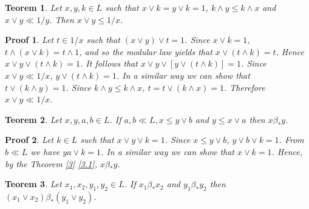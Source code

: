 \documentclass[a4paper,12pt]{article}
\numberwithin{equation}{section}
\theoremstyle{italik}
\newtheorem{teorem}{Teorem}[section]
\newtheorem*{ispat}{Proof}
\begin{document}

\begin{teorem}\label{16}
    Let $ x,y,k \in L $ such that $ x \vee k = y \vee k = 1 $, $ k \wedge y \leq k \wedge x $ and $ x \vee y \ll 1/y $. 
    Then $ x \vee y \leq 1/x $.
\end{teorem}

\begin{ispat}
    Let $ t \in 1/x $ such that $ ( x \vee y ) \vee t = 1 $. Since $ x \vee k = 1 $, $ t \wedge ( x \vee k ) = t \wedge 1 $, 
    and so the modular law yields that $ x \vee ( t \wedge k ) = t $. Hence $ x \vee y \vee ( t \wedge k ) = 1 $. 
    It follows that $ x \vee y \vee \left[ y \vee ( t \wedge k ) \right] = 1 $. Since $ x \vee y \ll 1/x $, 
    $ y \vee ( t \wedge k ) = 1 $. In a similar way we can show that $ t \vee ( k \wedge y ) = 1 $. 
    Since $ k \wedge y \leq k \wedge x $, $ t = t \vee ( k \wedge x ) = 1 $. Therefore $ x \vee y \ll 1/x $.
\end{ispat}

\begin{teorem}\label{17}
    Let $x,y,a,b \in L $. If $ a,b \ll L, x \leq y \vee b $ and $ y \leq x \vee a $ then $ x \beta_* y $.
\end{teorem}

\begin{ispat}
    Let $ k \in L $ such that $ x \vee y \vee k = 1 $. Since $ x \leq y \vee b $, $ y \vee b \vee k = 1 $. 
    From $ b \ll L $ we have $ ya \vee k = 1 $. In a similar way we can show that $ x \vee k = 1 $. 
    Hence, by the Theorem \ref{3} \ref{3.1}, $ x \beta_* y $.
\end{ispat}


\begin{teorem}\label{18}
    Let $ x_1,x_2,y_1,y_2 \in L $. If $ x_1 \beta_* x_2 $ and $ y_1 \beta_* y_2 $ then $ ( x_1 \vee x_2 ) \beta_* ( y_1 \vee y_2 ) $.
\end{teorem}
\end{document}
